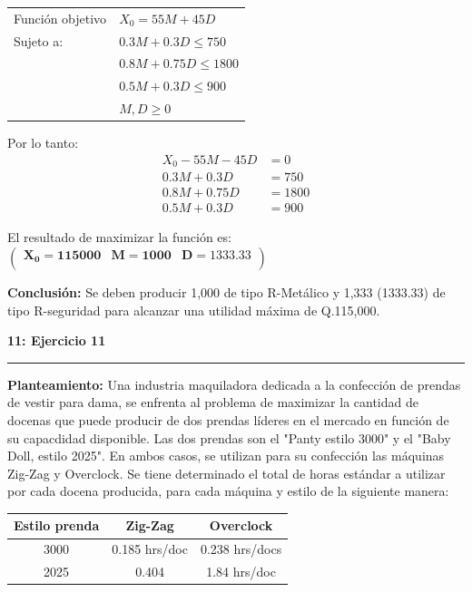 \documentclass[11pt]{article}
\newcommand\problema[2]{\vspace{.01in}\textbf{#1: #2}\vspace{.5em}\hrule\vspace{.10in}}
\newcommand\planteamiento{\vspace{.10in}\textbf{Planteamiento: }}
\newcommand\conclusion{\vspace{.10in}\textbf{Conclusión: }}
\begin{document}
\begin{table}[h]
\begin{tabular}{ll}
Función objetivo & $X_0 = 55M+45D$    \\
Sujeto a:        & $0.3M + 0.3D \leq 750$ \\
                 & $0.8M + 0.75D \leq 1800$ \\
                 & $0.5M + 0.3D \leq 900$ \\
                 & $M,D \geq 0$    
\end{tabular}
\end{table}

Por lo tanto:
\begin{align*}
X_0 - 55M - 45D &= 0\\
0.3M + 0.3D &= 750\\
0.8M + 0.75D &= 1800\\
0.5M + 0.3D &= 900
\end{align*}

El resultado de maximizar la función es:
\begin{math}
\mathbf{\left(\begin{array}{rrr}X_0=115000&M=1000&D=1333.33\\\end{array}\right)}
\end{math}

\conclusion Se deben producir 1,000 de tipo R-Metálico y 1,333 (1333.33) de tipo R-seguridad para alcanzar una utilidad máxima de Q.115,000.

\pagebreak
\problema{11}{Ejercicio 11}
\planteamiento
Una industria maquiladora dedicada a la confección de prendas de vestir para dama, se enfrenta al problema de maximizar la cantidad de docenas que puede producir de dos prendas líderes en el mercado en función de su capacdidad disponible. Las dos prendas son el "Panty estilo 3000" y el "Baby Doll, estilo 2025". En ambos casos, se utilizan para su confección las máquinas Zig-Zag y Overclock. Se tiene determinado el total de horas estándar a utilizar por cada docena producida, para cada máquina y estilo de la siguiente manera:

\begin{table}[h]
\begin{tabular}{|c|c|c|}
\hline
\textbf{Estilo prenda} & \textbf{Zig-Zag} & \textbf{Overclock} \\ \hline
3000                   & 0.185 hrs/doc    & 0.238 hrs/docs     \\ \hline
2025                   & 0.404            & 1.84 hrs/doc       \\ \hline
\end{tabular}
\end{table}
\end{document}
